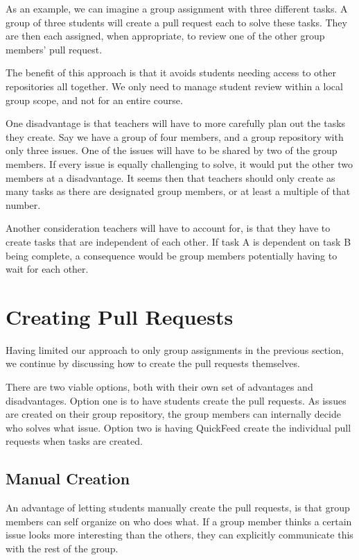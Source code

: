 As an example, we can imagine a group assignment with three different tasks.
A group of three students will create a pull request each to solve these tasks.
They are then each assigned, when appropriate, to review one of the other group members' pull request.

The benefit of this approach is that it avoids students needing access to other repositories all together.
We only need to manage student review within a local group scope, and not for an entire course.

One disadvantage is that teachers will have to more carefully plan out the tasks they create.
Say we have a group of four members, and a group repository with only three issues.
One of the issues will have to be shared by two of the group members.
If every issue is equally challenging to solve, it would put the other two members at a disadvantage.
It seems then that teachers should only create as many tasks as there are designated group members, or at least a multiple of that number.

Another consideration teachers will have to account for, is that they have to create tasks that are independent of each other.
If task A is dependent on task B being complete, a consequence would be group members potentially having to wait for each other.

\section{Creating Pull Requests}

Having limited our approach to only group assignments in the previous section, we continue by discussing how to create the pull requests themselves.

There are two viable options, both with their own set of advantages and disadvantages.
Option one is to have students create the pull requests.
As issues are created on their group repository, the group members can internally decide who solves what issue.
Option two is having QuickFeed create the individual pull requests when tasks are created.

\subsection{Manual Creation}

An advantage of letting students manually create the pull requests, is that group members can self organize on who does what.
If a group member thinks a certain issue looks more interesting than the others, they can explicitly communicate this with the rest of the group.

